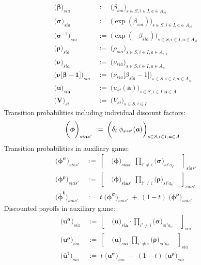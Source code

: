 \documentclass[11pt,fleqn]{article}
\newcommand{\bsigma}{\bm{\sigma}}
\newcommand{\bbeta}{\bm{\beta}}
\newcommand{\brho}{\bm{\rho}}
\newcommand{\bV}{\bm{V}}
\newcommand{\bnu}{\bm{\nu}}
\newcommand{\bone}{\bm{1}}
\newcommand{\ba}{\bm{a}}
\newcommand{\shortrightarrow}{\parbox{4pt}{\tikz{\draw[->](0,0)--(4pt,0);}}}
\newcommand{\phiss}{\phi_{s\shortrightarrow s'}}
\begin{document}
\begin{align*}
	\biggl( \bbeta \biggr)_{sia} & \;:=\; \biggl( \beta_{sia} \biggr)_{s\in S, i\in I,a \in A_{si}} \\
	\biggl( \bsigma \biggr)_{sia} & \;:=\; \biggl( \exp(\beta_{sia}) \biggr)_{s\in S, i\in I,a \in A_{si}} \\
	\biggl( \bsigma^{-1} \biggr)_{sia} & \;:=\; \biggl( \exp(-\beta_{sia}) \biggr)_{s\in S, i\in I,a \in A_{si}} \\
	\biggl( \brho \biggr)_{sia} & \;:=\; \biggl( \rho_{sia} \biggr)_{s\in S, i\in I, a\in A_{s,i}} \\
	\biggl( \bnu \biggr)_{sia} & \;:=\; \biggl( \nu_{sia} \biggr)_{s\in S, i\in I, a\in A_{si}} \\
	\biggl( \bnu\bigl[\bbeta-\bone\bigr] \biggr)_{sia} & \;:=\; \biggl( \nu_{sia}\bigl[\beta_{sia}-1\bigr] \biggr)_{s\in S, i\in I, a\in A_{si}} \\
	\biggl( \bm{u} \biggr)_{si\ba} & \;:=\; \biggl( u_{si}(\ba) \biggr)_{s\in S, i\in I, \ba\in A} \\
	\biggl( \bV \biggr)_{si} & \;:=\; \biggl( V_{si} \biggr)_{s\in S, i\in I}
\end{align*}
Transition probabilities including individual discount factors:
\begin{align*}
	\biggl( \bm{\phi} \biggr)_{si\ba s'} & \;:=\; \biggl( \delta_i \; \phiss(\ba) \biggr)_{s\in S, i\in I, \ba\in A}
\end{align*}
Transition probabilities in auxiliary game:
\begin{align*}
	\biggl( \bm{\phi^{\sigma}} \biggr)_{sias'} & \;:=\; \left[ \quad \biggl( \bm{\phi} \biggr)_{si\ba s'} \; \prod\limits_{i'\neq i} \biggl( \bsigma \biggr)_{si'a_{i'}} \quad \right]_{sias'} \\
	\biggl( \bm{\phi^{\rho}} \biggr)_{sias'} & \;:=\; \left[ \quad \biggl( \bm{\phi} \biggr)_{si\ba s'} \; \prod\limits_{i'\neq i} \biggl( \brho \biggr)_{si'a_{i'}} \quad \right]_{sias'} \\
	\biggl( \bm{{\bar{\phi}^t}} \biggr)_{sias'} & \;:=\; t \; \biggl( \bm{\phi^{\sigma}} \biggr)_{sias'} \;+\; (1-t) \; \biggl( \bm{\phi^{\rho}} \biggr)_{sias'}
\end{align*}
Discounted payoffs in auxiliary game:
\begin{align*}
	\biggl( \bm{u^{\sigma}} \biggr)_{sia} & \;:=\; \left[ \quad \biggl( \bm{u} \biggr)_{si\ba} \cdot \prod\limits_{i'\neq i} \biggl( \bsigma \biggr)_{si'a_{i'}} \quad \right]_{sia} \\
	\biggl( \bm{u^{\rho}} \biggr)_{sia} & \;:=\; \left[ \quad \biggl( \bm{u} \biggr)_{si\ba} \; \prod\limits_{i'\neq i} \biggl( \brho \biggr)_{si'a_{i'}} \quad \right]_{sia} \\
	\biggl( \bm{{\bar{u}^t}} \biggr)_{sia} & \;:=\; t \; \biggl( \bm{u^{\sigma}} \biggr)_{sia} \;+\; (1-t) \; \biggl( \bm{u^{\rho}} \biggr)_{sia}
\end{align*}
\end{document}
